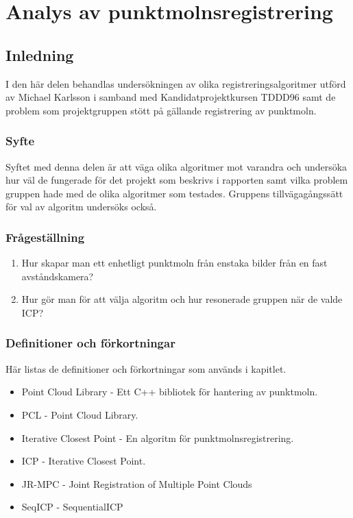 \chapter{Analys av punktmolnsregistrering}
\label{cha:indiv-report-karlsson}


\section{Inledning}
\label{sec:introduction-karlsson}

I den här delen behandlas undersökningen av olika registreringsalgoritmer utförd av Michael Karlsson i samband med Kandidatprojektkursen TDDD96 samt de problem som projektgruppen stött på gällande registrering av punktmoln.

\subsection{Syfte}
\label{sec:purpose-karlsson}

Syftet med denna delen är att väga olika algoritmer mot varandra och undersöka hur väl de fungerade för det projekt som beskrivs i rapporten samt vilka problem gruppen hade med de olika algoritmer som testades. Gruppens tillvägagångssätt för val av algoritm undersöks också.


\subsection{Frågeställning}
\label{sec:issue-karlsson}

\begin{enumerate}
	\item Hur skapar man ett enhetligt punktmoln från enstaka bilder från en fast \newline avståndskamera?
	\item Hur gör man för att välja algoritm och hur resonerade gruppen när de valde ICP?	
\end{enumerate}

\subsection{Definitioner och förkortningar}
\label{sec:definitions-acronyms-karlsson}

Här listas de definitioner och förkortningar som används i kapitlet.

\begin{itemize}
	\item Point Cloud Library - Ett C++ bibliotek för hantering av punktmoln.
	\item PCL - Point Cloud Library.
	\item Iterative Closest Point - En algoritm för punktmolnsregistrering.
	\item ICP - Iterative Closest Point.
	\item JR-MPC - Joint Registration of Multiple Point Clouds
	\item SeqICP - SequentialICP
\end{itemize}


